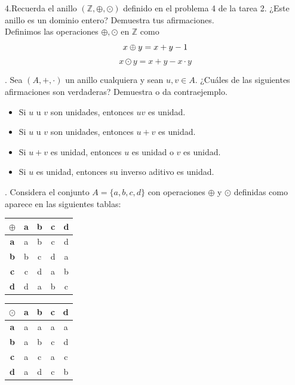 \documentclass[letterpaper]{article}
\newcommand{\mas}{\oplus}
\newcommand{\por}{\odot}
\newcommand{\Z}{\mathds{Z}}
\renewcommand{\*}{\cdot}
\theoremstyle{definition}
\begin{document}
\noindent4.Recuerda el anillo $ (\Z, \mas, \por) $ definido en el problema 4 de la tarea 2. ¿Este anillo es un dominio entero? Demuestra tus afirmaciones.\\

Definimos las operaciones $ \mas, \por $ en $ \Z $ como 
\begin{equation*}
	x \mas y = x + y -1\\
\end{equation*}
$$ x \por y = x + y - x\* y $$

. Sea $ (A, +, \*) $ un anillo cualquiera y sean $ u, v \in A $. ¿Cuáles de las siguientes afirmaciones son verdaderas? Demuestra o da contraejemplo.
\begin{itemize}
	\item Si $ u $ u $ v $ son unidades, entonces $ uv $ es unidad.
	\item Si $ u $ u $ v $ son unidades, entonces $ u + v $ es unidad.
	\item Si $ u + v $ es unidad, entonces $ u $ es unidad o $ v $ es unidad.
	\item Si $ u $ es unidad, entonces su inverso aditivo es unidad.
\end{itemize}
\newpage
{}. Considera el conjunto $ A = \{ a,b,c,d\} $ con operaciones $ \mas $ y $ \por $ definidas como aparece en las siguientes tablas:
\begin{table}[h]
	\centering
	\begin{tabular}{c|c|c|c|c}
		$ \mas $ & \textbf{a} & \textbf{b} & \textbf{c} & \textbf{d}\\ \hline
		 \textbf{a} & a & b & c & d \\ \hline
		 \textbf{b} & b & c & d & a \\ \hline
		 \textbf{c} & c & d & a & b \\ \hline
		 \textbf{d} & d & a & b & c \\
	\end{tabular}
	\hspace{3cm}
	\begin{tabular}{c|c|c|c|c}
		$ \por $ & \textbf{a} & \textbf{b} & \textbf{c} & \textbf{d}\\ \hline
		 \textbf{a} & a & a & a & a \\ \hline
		 \textbf{b} & a & b & c & d \\ \hline
		 \textbf{c} & a & c & a & c \\ \hline
		 \textbf{d} & a & d & c & b \\
	\end{tabular}
\end{table}
\end{document}
